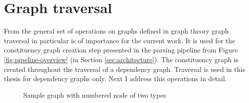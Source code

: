 \section{Graph traversal}
From the general set of operations on graphs defined in graph theory \citep{bondy1976graph, west2001graph} graph traversal in particular is of importance for the current work. It is used for the constituency graph creation step presented in the parsing pipeline from Figure \ref{fig:pipeline-overview} (in Section \ref{sec:architecture}). The constituency graph is created throughout the traversal of a dependency graph. Traversal is used in this thesis for dependency graphs only.  Next I address this operations in detail.


\begin{figure}[!ht]
    \centering
    \caption{Sample graph with numbered node of two types}
    \label{fig:example-traversal1}
\end{figure}



